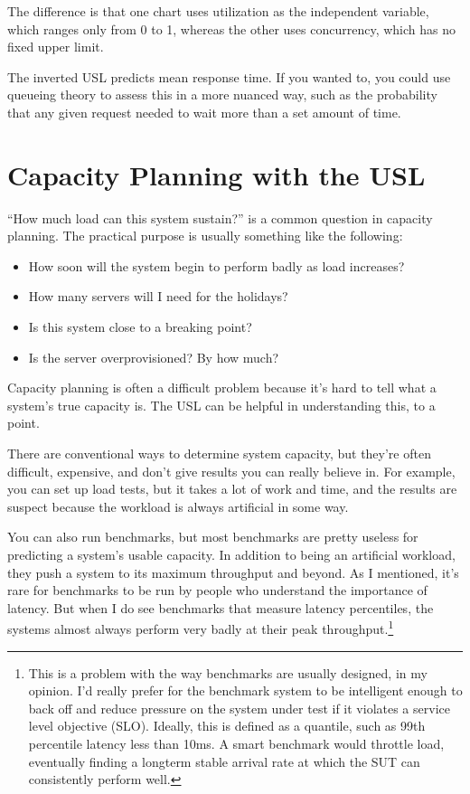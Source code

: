 \documentclass{vivid_layout}
\begin{document}
The difference is that one chart uses utilization as the independent variable,
which ranges only from 0 to 1, whereas the other uses concurrency, which has no
fixed upper limit.

The inverted USL predicts mean response time. If you wanted to, you could
use queueing theory to assess this in a more nuanced way, such as the
probability that any given request needed to wait more than a set amount of
time.

\section{Capacity Planning with the USL}

``How much load can this system sustain?'' is a common question in capacity
planning. The practical purpose is usually something like the following:

\begin{itemize}
\item How soon will the system begin to perform badly as load increases?
\item How many servers will I need for the holidays?
\item Is this system close to a breaking point?
\item Is the server overprovisioned? By how much?
\end{itemize}

Capacity planning is often a difficult problem because it's hard to tell what a
system's true capacity is. The USL can be helpful in understanding this, to a
point.

There are conventional ways to determine system capacity, but they're often
difficult, expensive, and don't give results you can really believe in. For
example, you can set up load tests, but it takes a lot of work and time, and the
results are suspect because the workload is always artificial in some
way.

You can also run benchmarks, but most benchmarks are pretty useless for
predicting a system's usable capacity. In addition to being an artificial
workload, they push a system to its maximum throughput and beyond. As I
mentioned, it's rare for benchmarks to be run by people who understand the
importance of latency. But when I do see benchmarks that measure latency
percentiles, the systems almost always perform very badly at their peak
throughput.\footnote{This is a problem with the way benchmarks are usually
designed, in my opinion. I'd really prefer for the benchmark system to be
intelligent enough to back off and reduce pressure on the system under test if
it violates a service level objective (SLO).  Ideally, this is defined as a
quantile, such as 99th percentile latency less than 10ms.  A smart benchmark
would throttle load, eventually finding a longterm stable arrival rate at which
the SUT can consistently perform well.}
\end{document}
